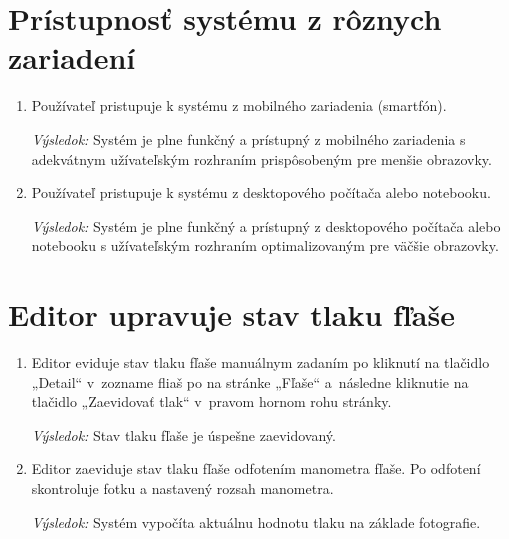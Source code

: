 \documentclass{zah}
\begin{document}
\section{Prístupnosť systému z rôznych zariadení}

\begin{enumerate}
	\item Používateľ pristupuje k systému z mobilného zariadenia (smartfón).
		
	\textit{Výsledok:} Systém je plne funkčný a prístupný z mobilného zariadenia s adekvátnym užívateľským rozhraním prispôsobeným pre menšie obrazovky.
	
	\item Používateľ pristupuje k systému z desktopového počítača alebo notebooku.
		
	\textit{Výsledok:} Systém je plne funkčný a prístupný z desktopového počítača alebo notebooku s užívateľským rozhraním optimalizovaným pre väčšie obrazovky.
\end{enumerate}

\clearpage
\section{Editor upravuje stav tlaku fľaše}

\begin{enumerate}
	\item Editor eviduje stav tlaku fľaše manuálnym zadaním po kliknutí na tlačidlo „Detail“ v zozname fliaš po na stránke „Fľaše“ a následne kliknutie na tlačidlo „Zaevidovať tlak“ v pravom hornom rohu stránky.
	
	\textit{Výsledok:} Stav tlaku fľaše je úspešne zaevidovaný.

	\item Editor zaeviduje stav tlaku fľaše odfotením manometra fľaše. Po odfotení skontroluje fotku a nastavený rozsah manometra.

	\textit{Výsledok:} Systém vypočíta aktuálnu hodnotu tlaku na základe fotografie.
\end{enumerate}
\end{document}
